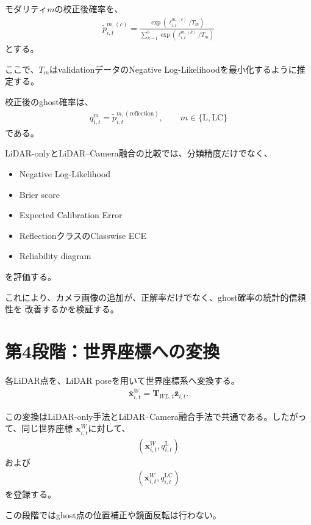 \documentclass[uplatex,a4paper,11pt]{jsarticle}
\begin{document}
モダリティ$m$の校正後確率を、
\begin{align}
  \tilde{p}_{i,t}^{m,(c)}
  =
  \frac{
    \exp
    \left(
      \ell_{i,t}^{m,(c)}/T_m
    \right)
  }{
    \sum_{k=1}^{6}
    \exp
    \left(
      \ell_{i,t}^{m,(k)}/T_m
    \right)
  }
\end{align}
とする。

ここで、$T_m$はvalidationデータのNegative Log-Likelihoodを最小化するように推定する。

校正後のghost確率は、
\begin{align}
  q_{i,t}^{m}
  =
  \tilde{p}_{i,t}^{m,(\mathrm{reflection})},
  \qquad
  m\in\{\mathrm{L},\mathrm{LC}\}
\end{align}
である。

LiDAR-onlyとLiDAR--Camera融合の比較では、分類精度だけでなく、
\begin{itemize}
  \item Negative Log-Likelihood
  \item Brier score
  \item Expected Calibration Error
  \item ReflectionクラスのClasswise ECE
  \item Reliability diagram
\end{itemize}
を評価する。

これにより、カメラ画像の追加が、正解率だけでなく、ghost確率の統計的信頼性を
改善するかを検証する。

\section{第4段階：世界座標への変換}

各LiDAR点を、LiDAR poseを用いて世界座標系へ変換する。
\begin{align}
  \bar{\bm{x}}_{i,t}^{W}
  =
  \bm{T}_{WL,t}
  \bar{\bm{z}}_{i,t}.
\end{align}

この変換はLiDAR-only手法とLiDAR--Camera融合手法で共通である。したがって、同じ世界座標
$\bm{x}_{i,t}^{W}$に対して、
\begin{align}
  \left(
    \bm{x}_{i,t}^{W},
    q_{i,t}^{\mathrm{L}}
  \right)
\end{align}
および
\begin{align}
  \left(
    \bm{x}_{i,t}^{W},
    q_{i,t}^{\mathrm{LC}}
  \right)
\end{align}
を登録する。

この段階ではghost点の位置補正や鏡面反転は行わない。
\end{document}
